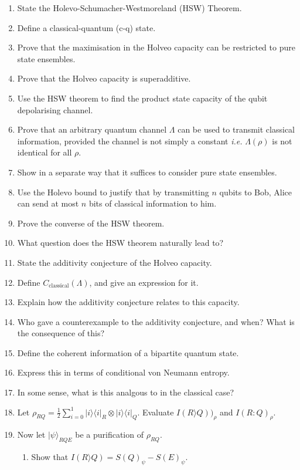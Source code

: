 \documentclass{article}
\newcommand{\ket}[1]{|#1\rangle}
\newcommand{\bra}[1]{\langle #1 |}
\begin{document}
\begin{enumerate}
    \item State the Holevo-Schumacher-Westmoreland (HSW) Theorem.
    \item Define a classical-quantum (c-q) state.
    \item Prove that the maximisation in the Holveo capacity can be restricted to pure state ensembles.
    \item Prove that the Holveo capacity is superadditive.
    \item Use the HSW theorem to find the product state capacity of the qubit depolarising channel.
    \item Prove that an arbitrary quantum channel $\Lambda$ can be used to transmit classical information, provided the channel is not simply a constant \textit{i.e.} $\Lambda(\rho)$ is not identical for all $\rho$.
    \item Show in a separate way that it suffices to consider pure state ensembles.
    \item Use the Holevo bound to justify that by transmitting $n$ qubits to Bob, Alice can send at most $n$ bits of classical information to him.
    \item Prove the converse of the HSW theorem.
    \item What question does the HSW theorem naturally lead to?
    \item State the additivity conjecture of the Holveo capacity.
    \item Define $C_{\textrm{classical}}(\Lambda)$, and give an expression for it.
    \item Explain how the additivity conjecture relates to this capacity.
    \item Who gave a counterexample to the additivity conjecture, and when? What is the consequence of this?
    \item Define the coherent information of a bipartite quantum state.
    \item Express this in terms of conditional von Neumann entropy.
    \item In some sense, what is this analgous to in the classical case?
    \item Let $\rho_{RQ} = \frac{1}{2}\sum_{i=0}^{1}\ket{i}\bra{i}_R\otimes\ket{i}\bra{i}_Q$. Evaluate $I(R\rangle Q))_\rho$ and $I(R:Q)_\rho$.
    \item Now let $\ket{\psi}_{RQE}$ be a purification of $\rho_{RQ}$.
    \begin{enumerate}
        \item Show that $I(R\rangle Q) = S(Q)_\psi - S(E)_\psi$.

\end{enumerate}
\end{enumerate}
\end{document}
